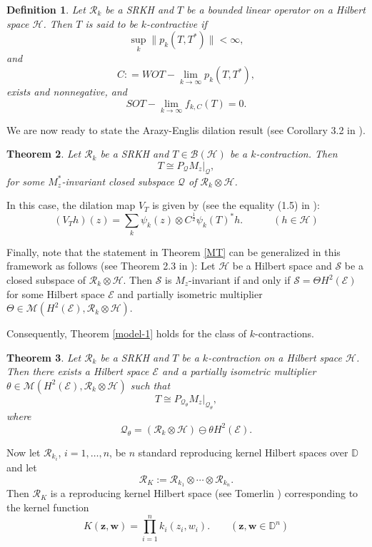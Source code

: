\documentclass[12pt]{amsart}
\newtheorem{Theorem}{\sc Theorem}[section]
\newtheorem{Definition}[Theorem]{\sc Definition}
\begin{document}
\begin{Definition} Let ${\mathcal{R}}_k$ be a SRKH and $T$ be a bounded linear operator on
a Hilbert space ${\mathcal{H}}$. Then $T$ is said to be $k$-contractive if
\[\sup_{k} \|p_k(T, T^*)\| < \infty,\]and
\[C: = WOT-\lim_{k {\rightarrow} \infty} p_k(T, T^*),\]exists and
nonnegative, and
\[SOT-\lim_{k {\rightarrow} \infty} f_{k, C}(T) = 0.\]
\end{Definition}

We are now ready to state the Arazy-Englis dilation result (see
Corollary 3.2 in \cite{AE}).

\begin{Theorem}
Let ${\mathcal{R}}_k$ be a SRKH and $T \in {\mathcal{B}}({\mathcal{H}})$ be a $k$-contraction.
Then \[T \cong P_{\mathcal{Q}} M_z|_{\mathcal{Q}},\]for some $M_z^*$-invariant
closed subspace ${\mathcal{Q}}$ of ${\mathcal{R}}_k \otimes {\mathcal{H}}$.
\end{Theorem}

In this case, the dilation map $V_T$ is given by (see the equality
(1.5) in \cite{AE}): \[(V_{T} h)(z) = \sum_k \psi_k(z) \otimes
C^{\frac{1}{2}} \psi_k(T)^* h. \quad \quad \quad (h \in {\mathcal{H}})\]

Finally, note that the statement in Theorem \ref{MT} can be
generalized in this framework as follows (see Theorem 2.3 in
\cite{JS}): Let ${\mathcal{H}}$ be a Hilbert space and ${\mathcal{S}}$ be a closed
subspace of ${\mathcal{R}}_k \otimes {\mathcal{H}}$. Then ${\mathcal{S}}$ is $M_z$-invariant if
and only if ${\mathcal{S}} = \Theta H^2({\mathcal{E}})$ for some Hilbert space ${\mathcal{E}}$
and partially isometric multiplier $\Theta \in {\mathcal{M}}(H^2({\mathcal{E}}),
{\mathcal{R}}_k \otimes {\mathcal{H}})$.

{\noindent} Consequently, Theorem \ref{model-1} holds for the class of
$k$-contractions.

\begin{Theorem}
Let ${\mathcal{R}}_k$ be a SRKH and $T$ be a $k$-contraction on a Hilbert
space ${\mathcal{H}}$. Then there exists a Hilbert space ${\mathcal{E}}$ and a
partially isometric multiplier $\theta \in {\mathcal{M}}(H^2({\mathcal{E}}), {\mathcal{R}}_k
\otimes {\mathcal{H}})$ such that
\[T \cong P_{{\mathcal{Q}}_{\theta}} M_z|_{{\mathcal{Q}}_{\theta}},\]where
\[{\mathcal{Q}}_{\theta} = ({\mathcal{R}}_k \otimes {\mathcal{H}}) \ominus \theta H^2({\mathcal{E}}).\]
\end{Theorem}

Now let ${\mathcal{R}}_{k_i}$, $i = 1, \ldots, n$, be $n$ standard
reproducing kernel Hilbert spaces over ${\mathbb{D}}$ and let
\[{\mathcal{R}}_K := {\mathcal{R}}_{k_1} \otimes \cdots \otimes {\mathcal{R}}_{k_n}.\]Then
${\mathcal{R}}_K$ is a reproducing kernel Hilbert space (see Tomerlin
\cite{T}) corresponding to the kernel function \[K({\bm{z}}, {\bm{w}}) =
\prod_{i=1}^n k_i(z_i, w_i). \quad \quad ({\bm{z}}, {\bm{w}} \in {\mathbb{D}}^n)\]
\end{document}
